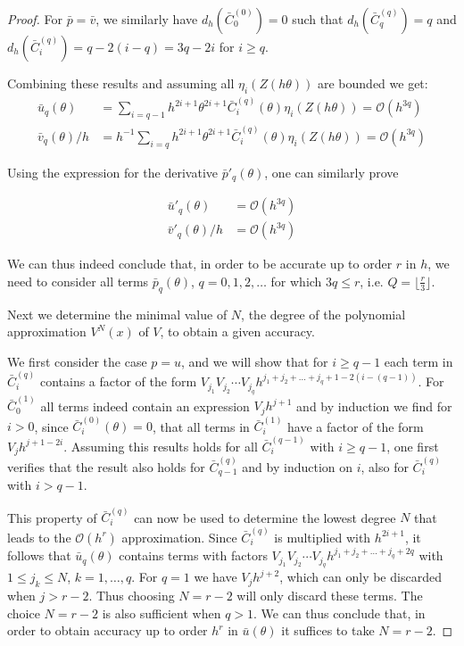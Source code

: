 \begin{proof}
    For $\bar{p}=\bar{v}$, we similarly have $d_h\left(\bar{C}_{0}^{(0)}\right)=0$ such that $d_h\left(\bar{C}_{q}^{(q)}\right)=q$ and $d_h\left(\bar{C}_{i}^{(q)}\right) = q-2(i-q)=3q-2i$ for $i \geq q$.

    Combining these results and assuming all $\eta_i(Z(h\theta))$ are bounded we get:
    \begin{align*}
        \bar{u}_{q}(\theta)   & =  \sum_{i=q-1} h^{2i+1} \theta^{2i+1} \bar{C}^{(q)}_i(\theta) \eta_{i}(Z(h\theta)) = \mathcal{O}(h^{3q})     \\
        \bar{v}_{q}(\theta)/h & = h^{-1} \sum_{i=q} h^{2i+1} \theta^{2i+1} \bar{C}^{(q)}_i(\theta) \eta_{i}(Z(h\theta)) = \mathcal{O}(h^{3q})
    \end{align*}

    Using the expression for the derivative $\bar{p}'_{q}(\theta)$, one can similarly prove

    \begin{align*}
        \bar{u}'_{q}(\theta)   & =  \mathcal{O}(h^{3q}) \\
        \bar{v}'_{q}(\theta)/h & = \mathcal{O}(h^{3q})
    \end{align*}

    We can thus indeed conclude that, in order to be accurate up to order $r$ in $h$, we need to consider all terms $\bar{p}_q(\theta)$, $q=0,1,2,\ldots$ for which $3q \leq r$, i.e. $Q= \lfloor \frac{r}{3} \rfloor$.

    Next we determine the minimal value of $N$, the degree of the polynomial approximation $V^{N}(x)$ of $V$, to obtain a given accuracy.

    We first consider the case $p=u$, and we will show that for $i \geq q-1$ each term in $\bar{C}_i^{(q)}$ contains a factor of the form $ V_{j_1} V_{j_2} \cdots V_{j_q} h^{j_1+j_2+\ldots+j_q+1 - 2 (i-(q-1))}$. For $\bar{C}_0^{(1)}$ all terms indeed contain an expression $V_j h^{j+1}$ and by induction we find for $i>0$, since $\bar{C}_i^{(0)}(\theta)=0$, that all terms in $\bar{C}_i^{(1)}$ have a factor of the form $V_j h^{j+1-2i}$. Assuming this results holds for all $\bar{C}_i^{(q-1)}$ with $i\geq q - 1$, one first verifies that the result also holds for $\bar{C}_{q-1}^{(q)}$ and by induction on $i$,  also for $\bar{C}_{i}^{(q)}$ with $i>q-1$.

    This property of $\bar{C}_i^{(q)}$ can now be used to determine the lowest degree $N$ that leads to the $\mathcal{O}(h^r)$ approximation. Since $\bar{C}_i^{(q)}$ is multiplied with $h^{2i+1}$, it follows that  $\bar{u}_q(\theta)$ contains terms with factors $ V_{j_1} V_{j_2} \cdots V_{j_q} h^{j_1+j_2+\ldots+j_q+ 2 q }$ with $1 \leq j_k \leq N$, $k=1,\ldots, q$. For $q=1$ we have $V_{j} h^{j+2} $, which can only be discarded when $j>r-2$. Thus choosing $N=r-2$ will only discard these terms. The choice $N=r-2$ is also sufficient when $q>1$. We can thus conclude that, in order to obtain accuracy up to order $h^r$ in $\bar{u}(\theta)$ it suffices to take $N=r-2$.


\end{proof}
